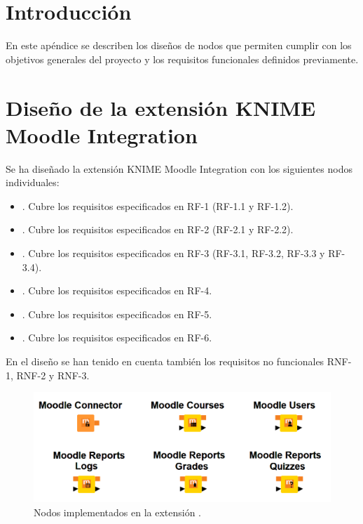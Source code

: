 \label{sec:appendixC}

\section{Introducción}

En este apéndice se describen los diseños de nodos que permiten cumplir con los objetivos
 generales del proyecto y los requisitos funcionales definidos previamente. 

\section{Diseño de la extensión KNIME Moodle Integration}

Se ha diseñado la extensión KNIME Moodle Integration con los siguientes nodos individuales: 

\begin{itemize}
  \item {}. Cubre los requisitos especificados en RF-1 (RF-1.1 y RF-1.2). 
  \item {}. Cubre los requisitos especificados en RF-2 (RF-2.1 y RF-2.2).
  \item {}. Cubre los requisitos especificados en RF-3 (RF-3.1, RF-3.2, RF-3.3 y RF-3.4).
  \item {}. Cubre los requisitos especificados en RF-4. 
  \item {}. Cubre los requisitos especificados en RF-5. 
  \item {}. Cubre los requisitos especificados en RF-6. 
\end{itemize}

En el diseño se han tenido en cuenta también los requisitos no funcionales RNF-1, RNF-2 y RNF-3. 
\

\begin{figure}[!h]
	\centering
	\includegraphics[width=1\textwidth]{img/nodes_moodle_todos.png}
	\caption{Nodos implementados en la extensión .}
	\label{fig:moodlenodesall}
\end{figure}
\FloatBarrier


